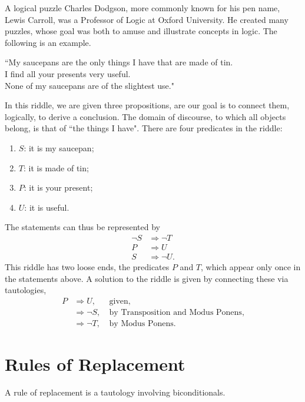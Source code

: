 \begin{example}{A logical puzzle}
Charles Dodgson, more commonly known for his pen name, Lewis Carroll, was a Professor of Logic at Oxford University. He created many puzzles, whose goal was both to amuse and illustrate concepts in logic. The following is an example. 
\begin{center}
``My saucepans are the only things I have that are made of tin. \\
I find all your presents very useful. \\
None of my saucepans are of the slightest use." 
\end{center}

In this riddle, we are given three propositions, are our goal is to connect them, logically, to derive a conclusion. The domain of discourse, to which all objects belong, is that of ``the things I have". There are four predicates in the riddle:
\begin{enumerate}
\item $S$: it is my saucepan;
\item $T$: it is made of tin;
\item $P$: it is your present; 
\item $U$: it is useful.
\end{enumerate}

The statements can thus be represented by
\begin{align*}
\neg S & \Rightarrow \neg T \\
P & \Rightarrow U \\
S & \Rightarrow \neg U.
\end{align*}
This riddle has two loose ends, the predicates $P$ and $T$, which appear only once in the statements above. A solution to the riddle is given by connecting these via tautologies, 
\begin{align*}
P & \Rightarrow U, & \ \mbox{given,} \\
& \Rightarrow \neg S, & \ \mbox{by Transposition and Modus Ponens},\\
& \Rightarrow \neg T, & \ \mbox{by Modus Ponens.}
\end{align*}

\end{example}


\section{Rules of Replacement}
A rule of replacement is a tautology involving biconditionals. 

